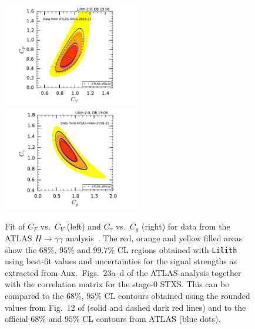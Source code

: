 \begin{figure}[h!]\centering
\includegraphics[width=0.54\textwidth]{validation/ATLAS/HIGG-2016-21-CVCF.pdf}%
\hspace{-13mm}\includegraphics[width=0.54\textwidth]{validation/ATLAS/HIGG-2016-21-CgCGa.pdf}%
\vspace*{-2mm}
\caption{Fit of $C_F$ vs.\ $C_V$ (left) and $C_\gamma$ vs.\ $C_g$ (right) for data from the ATLAS $H\to\gamma\gamma$ analysis~\cite{Aaboud:2018xdt}. The red, orange and yellow filled areas show the 
$68\%$,  $95\%$ and $99.7\%$ CL regions obtained with {\tt Lilith} using best-fit values and uncertainties for the signal strengths 
as extracted from Aux.\ Figs.~23a--d of the ATLAS analysis together with the correlation matrix for the stage-0 STXS. 
This can be compared to the $68\%$,  $95\%$ CL contours obtained using the rounded values from Fig.~12 of \cite{Sirunyan:2018koj} 
(solid and dashed dark red lines) and to the official $68\%$ and $95\%$ CL contours from ATLAS (blue dots).}
\label{fig:validation_atlas_gamgam}
\end{figure}
 

